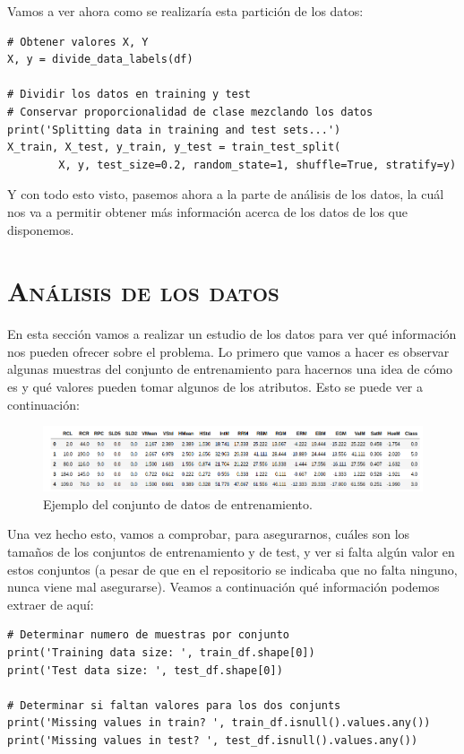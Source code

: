 \documentclass[11pt,a4paper]{article}
\begin{document}
Vamos a ver ahora como se realizaría esta partición de los datos:

\begin{lstlisting}
# Obtener valores X, Y
X, y = divide_data_labels(df)

# Dividir los datos en training y test
# Conservar proporcionalidad de clase mezclando los datos
print('Splitting data in training and test sets...')
X_train, X_test, y_train, y_test = train_test_split(
        X, y, test_size=0.2, random_state=1, shuffle=True, stratify=y)
\end{lstlisting}

Y con todo esto visto, pasemos ahora a la parte de análisis de los datos, la cuál nos va a permitir obtener más información acerca de
los datos de los que disponemos.

\newpage

\section{\textsc{Análisis de los datos}}

En esta sección vamos a realizar un estudio de los datos para ver qué información nos pueden ofrecer sobre el problema. Lo primero que
vamos a hacer es observar algunas muestras del conjunto de entrenamiento para hacernos una idea de cómo es y qué valores pueden tomar
algunos de los atributos. Esto se puede ver a continuación:

\begin{figure}[H]
    \centering
    \includegraphics[scale=0.4]{img/train_df_head.png}
    \caption{Ejemplo del conjunto de datos de entrenamiento.}
    \label{fig:train_df}
\end{figure}

Una vez hecho esto, vamos a comprobar, para asegurarnos, cuáles son los tamaños de los conjuntos de entrenamiento y de test, y ver
si falta algún valor en estos conjuntos (a pesar de que en el repositorio se indicaba que no falta ninguno, nunca viene mal asegurarse).
Veamos a continuación qué información podemos extraer de aquí:

\begin{lstlisting}
# Determinar numero de muestras por conjunto
print('Training data size: ', train_df.shape[0])
print('Test data size: ', test_df.shape[0])

# Determinar si faltan valores para los dos conjunts
print('Missing values in train? ', train_df.isnull().values.any())
print('Missing values in test? ', test_df.isnull().values.any())
\end{lstlisting}
\end{document}
